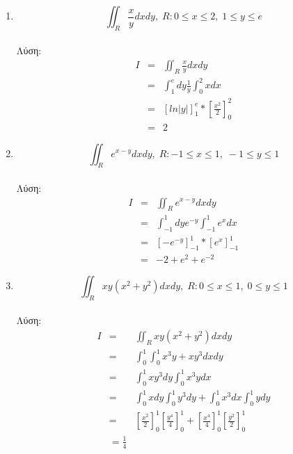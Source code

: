 \documentclass{article}
\begin{document}
{\begin{enumerate}
\begin{enumerate}{}
\item $$\iint _{R} \frac{x}{y} dxdy,\;R:0\leq x\leq 2,\; 1\leq y \leq e$$ \\
Λύση:
\begin{eqnarray*}
I &=& \iint _{R}\frac{x}{y} dxdy \\
& = & \int _{1} ^{e} dy \frac{1}{y} \int_{0}^{2} x dx \\
& = & \left[ ln|y| \right]^e_1*\left[ \frac{x^2}{2} \right]^2_0\\
& = & 2
\end{eqnarray*}

\item $$\iint _{R} e^{x-y}dxdy,\;R:-1\leq x\leq 1,\; -1\leq y \leq 1$$ \\
Λύση:
\begin{eqnarray*}
I &=& \iint _{R}e^{x-y} dxdy \\
& = & \int _{-1} ^{1} dy e^{-y} \int_{-1}^{1} e^x dx \\
& = & \left[ -e^{-y} \right]^1_{-1}*\left[ e^x\right]^1_{-1}\\
& = & -2+e^2+e^{-2}
\end{eqnarray*}

\item $$\iint _{R} xy(x^2+y^2) dxdy,\;R:0\leq x\leq 1,\; 0\leq y \leq 1$$ \\
Λύση:
\begin{eqnarray*}
I &=& \iint _{R}xy(x^2+y^2) dxdy \\
& = & \int _{0} ^{1} \int _{0} ^{1} x^3y+xy^3 dxdy\\
& = & \int _{0} ^{1} xy^3 dy \int _{0} ^{1} x^3y dx\\
& = & \int _{0} ^{1} x dy \int _{0} ^{1} y^3dy + \int _{0} ^{1}x^3 dx \int _{0} ^{1} y dy\\
& = & \left[ \frac{x^2}{2} \right]^1_0\left[ \frac{y^4}{4} \right]^1_0+\left[ \frac{x^4}{4}\right]^1_0\left[ \frac{y^2}{2}\right]^1_0\\
& = \frac{1}{4}
\end{eqnarray*}


\end{enumerate}
\end{enumerate}}
\end{document}
